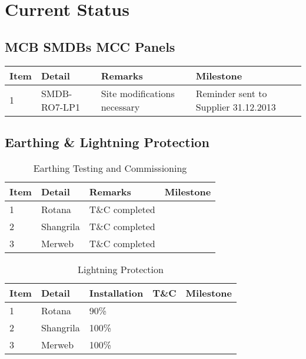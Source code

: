 \section{Current Status}
\subsection{MCB SMDBs MCC Panels}

{\RaggedRight
\begin{tabular}{llp{3cm}p{3cm}}
\toprule
Item &Detail &Remarks &Milestone\\
\midrule
1    &SMDB-RO7-LP1 &Site modifications necessary 
     & Reminder sent to Supplier 31.12.2013 \\
\bottomrule
\end{tabular}
}

\subsection{Earthing \& Lightning Protection}

\begin{table}[h]
{\RaggedRight
\begin{tabular}{llp{3cm}p{3cm}}
\toprule
Item &Detail &Remarks &Milestone\\
\midrule
1    & Rotana & T\&C completed & \\
2    & Shangrila & T\&C completed & \\
3    & Merweb & T\&C completed & \\   
\bottomrule
\end{tabular}
\caption{Earthing Testing and Commissioning}
}
\end{table}

\begin{table}[h]
{\RaggedRight
\begin{tabular}{lllll}
\toprule
Item &Detail &Installation &T\&C &Milestone\\
\midrule
1    & Rotana         & 90\%  & & \\
2    & Shangrila      & 100\% & &\\
3    & Merweb         & 100\% & &\\   
\bottomrule
\end{tabular}
\caption{Lightning Protection}
}
\end{table}

